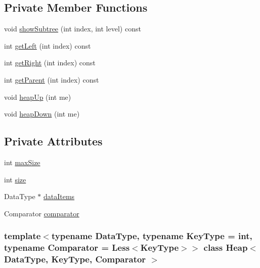 \subsection*{\-Private \-Member \-Functions}
\begin{DoxyCompactItemize}
\item 
void \hyperlink{class_heap_a49a54dd4782e6c68f14a5df3ba4da7af}{show\-Subtree} (int index, int level) const 
\item 
int \hyperlink{class_heap_a16bf14bc857237c3d19f2583d8bdee0e}{get\-Left} (int index) const 
\item 
int \hyperlink{class_heap_ad748987560679176248ee980978e9a2f}{get\-Right} (int index) const 
\item 
int \hyperlink{class_heap_a0a67a2c91d1beefb12116a9a48059d5a}{get\-Parent} (int index) const 
\item 
void \hyperlink{class_heap_a450924517c7b489c3b4c8947cf4e97da}{heap\-Up} (int me)
\item 
void \hyperlink{class_heap_a992f7b25619e799f911db94aff303c01}{heap\-Down} (int me)
\end{DoxyCompactItemize}
\subsection*{\-Private \-Attributes}
\begin{DoxyCompactItemize}
\item 
int \hyperlink{class_heap_a7f8e5c3cc64b8799b4e75b5a0f675e69}{max\-Size}
\item 
int \hyperlink{class_heap_a0964c2d309605bee2f6f1a9cee9ab89a}{size}
\item 
\-Data\-Type $\ast$ \hyperlink{class_heap_ace779ec73409a031eda4a7c1b898eb56}{data\-Items}
\item 
\-Comparator \hyperlink{class_heap_adc20ebd4d97dff37f19ced91ccdc4560}{comparator}
\end{DoxyCompactItemize}
\subsubsection*{template$<$typename \-Data\-Type, typename \-Key\-Type = int, typename \-Comparator = \-Less$<$\-Key\-Type$>$$>$ class Heap$<$ Data\-Type, Key\-Type, Comparator $>$}




